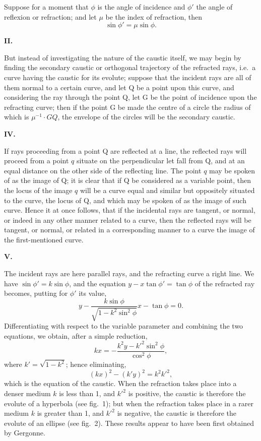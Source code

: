 \documentclass[11pt,a4paper]{book}
\begin{document}
\begin{center}
Suppose for a moment that $\phi$ is the angle of incidence and $\phi'$ the angle of
reflexion or refraction; and let $\mu$ be the index of refraction, then
\[\sin\phi' = \mu\sin\phi.\]

\medskip
\noindent\textbf{II.}

But instead of investigating the nature of the caustic itself, we may begin by
finding the secondary caustic or orthogonal trajectory of the refracted rays, i.e.\ a
curve having the caustic for its evolute; suppose that the incident rays are all of
them normal to a certain curve, and let Q be a point upon this curve, and
considering the ray through the point Q, let G be the point of incidence upon the
refracting curve; then if the point G be made the centre of a circle the radius of
which is $\mu^{-1}\cdot GQ$, the envelope of the circles will be the secondary caustic.

\medskip
\noindent\textbf{IV.}

If rays proceeding from a point Q are reflected at a line, the reflected rays will
proceed from a point $q$ situate on the perpendicular let fall from Q, and at an equal
distance on the other side of the reflecting line. The point $q$ may be spoken of as
the image of Q; it is clear that if Q be considered as a variable point, then the
locus of the image $q$ will be a curve equal and similar but oppositely situated to
the curve, the locus of Q, and which may be spoken of as the image of such curve.
Hence it at once follows, that if the incidental rays are tangent, or normal, or indeed
in any other manner related to a curve, then the reflected rays will be tangent, or
normal, or related in a corresponding manner to a curve the image of the first-mentioned curve.

\clearpage
\noindent\textbf{V.}

The incident rays are here parallel rays, and the refracting curve a right line.
We have $\sin\phi' = k\sin\phi$, and the equation $y - x\tan\phi' = \tan\phi$ of the refracted
ray becomes, putting for $\phi'$ its value,
\[y - \frac{k\sin\phi}{\sqrt{1-k^2\sin^2\phi}}x - \tan\phi = 0.\]
Differentiating with respect to the variable parameter and combining the two
equations, we obtain, after a simple reduction,
\[kx = -\frac{k^2y - k'^2\sin^2\phi}{\cos^2\phi},\]
where $k' = \sqrt{1-k^2}$; hence eliminating,
\[(kx)^2 - (k'y)^2 = k^2k'^2,\]
which is the equation of the caustic. When the refraction takes place into a
denser medium $k$ is less than 1, and $k'^2$ is positive, the caustic is therefore the
evolute of a hyperbola (see fig.~1); but when the refraction takes place in a
rarer medium $k$ is greater than 1, and $k'^2$ is negative, the caustic is therefore the
evolute of an ellipse (see fig.~2). These results appear to have been first obtained
by Gergonne.


\end{center}
\end{document}
